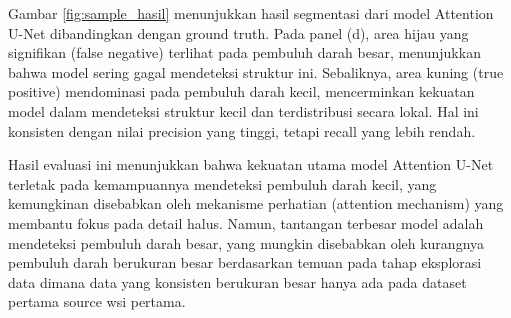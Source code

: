 \noindent Gambar \ref{fig:sample_hasil} menunjukkan hasil segmentasi dari model Attention U-Net dibandingkan dengan ground truth. Pada panel (d), area hijau yang signifikan (false negative) terlihat pada pembuluh darah besar, menunjukkan bahwa model sering gagal mendeteksi struktur ini. Sebaliknya, area kuning (true positive) mendominasi pada pembuluh darah kecil, mencerminkan kekuatan model dalam mendeteksi struktur kecil dan terdistribusi secara lokal. Hal ini konsisten dengan nilai precision yang tinggi, tetapi recall yang lebih rendah.

\noindent Hasil evaluasi ini menunjukkan bahwa kekuatan utama model Attention U-Net terletak pada kemampuannya mendeteksi pembuluh darah kecil, yang kemungkinan disebabkan oleh mekanisme perhatian (attention mechanism) yang membantu fokus pada detail halus. Namun, tantangan terbesar model adalah mendeteksi pembuluh darah besar, yang mungkin disebabkan oleh kurangnya pembuluh darah berukuran besar berdasarkan temuan pada tahap eksplorasi data dimana data yang konsisten berukuran besar hanya ada pada dataset pertama source wsi pertama.













